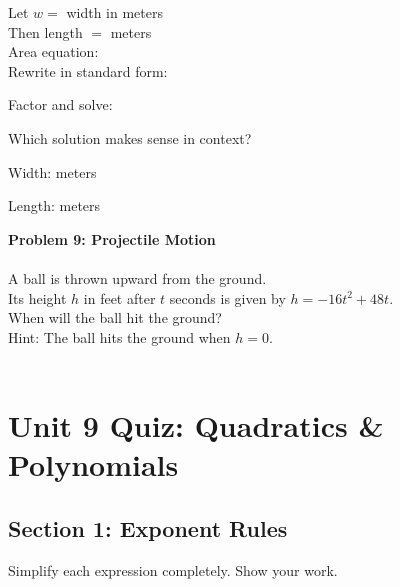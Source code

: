 \documentclass[12pt]{article}
\begin{document}
			Let $w = $ width in meters\\

			Then length $= $ \underline{\hspace{1.5in}} meters\\

			Area equation: \underline{\hspace{2.5in}}\\

			Rewrite in standard form:

			\vspace{2cm}

			Factor and solve:

			\vspace{3cm}

			Which solution makes sense in context? \underline{\hspace{1in}}

			Width: \underline{\hspace{1in}} meters

			Length: \underline{\hspace{1in}} meters

			\newpage

			\textbf{Problem 9: Projectile Motion}\\\\

			A ball is thrown upward from the ground.\\

			Its height $h$ in feet after $t$ seconds is given by $h = -16t^2 + 48t$.\\

			When will the ball hit the ground?\\

			Hint: The ball hits the ground when $h = 0$.\\\\

            \newpage
  
    \section*{Unit 9 Quiz: Quadratics \& Polynomials}

        \subsection*{Section 1: Exponent Rules}
            
            Simplify each expression completely. Show your work.\\\\
            
\end{document}
